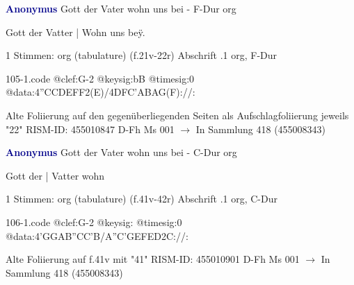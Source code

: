 \documentclass[twocolumn]{book}
\begin{document}
\newline \par \vspace{7pt} \textcolor{darkblue}{\textbf{Anonymus  }}
\newline Gott der Vater wohn uns bei - F-Dur
\newline org
\newline \begin{itshape}[f.21v, at left:] Gott der Vatter | Wohn uns beÿ.\end{itshape} 
\newline \textcolor{darkblue}{}  1 Stimmen: org (tabulature)  (f.21v-22r)
\newline Abschrift
.1  org, F-Dur  
\begin{filecontents*}{105-1.code}
@clef:G-2
@keysig:bB
@timesig:0
@data:4''CCDEFF2(E)/4DFC'ABAG(F)://:
\end{filecontents*}
\newline
%
\newline Alte Foliierung auf den gegenüberliegenden Seiten als Aufschlagfoliierung jeweils "22"
\newline RISM-ID: 455010847
\newline D-Fh  Ms 001
\newline $\rightarrow$ In Sammlung 418 (455008343)
      
\newline \par \vspace{7pt} \textcolor{darkblue}{\textbf{Anonymus  }}
\newline Gott der Vater wohn uns bei - C-Dur
\newline org
\newline \begin{itshape}[f.41v, at left:] Gott der | Vatter wohn\end{itshape} 
\newline \textcolor{darkblue}{}  1 Stimmen: org (tabulature)  (f.41v-42r)
\newline Abschrift
.1  org, C-Dur  
\begin{filecontents*}{106-1.code}
@clef:G-2
@keysig:
@timesig:0
@data:4'GGAB''CC'B/A''C'GEFED2C://:
\end{filecontents*}
\newline
%
\newline Alte Foliierung auf f.41v mit "41"
\newline RISM-ID: 455010901
\newline D-Fh  Ms 001
\newline $\rightarrow$ In Sammlung 418 (455008343)
      
\end{document}
